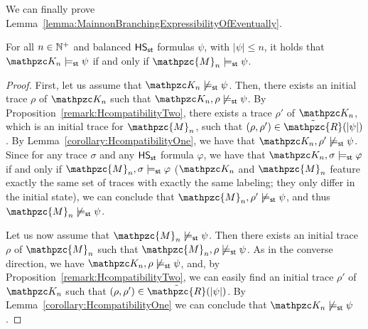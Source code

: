 We can finally prove Lemma~\ref{lemma:MainnonBranchingExpressibilityOfEventually}.
\begin{lemma*}[\ref{lemma:MainnonBranchingExpressibilityOfEventually}]
For all $n\in\mathbb{N}^+$ and balanced $\text{\sffamily HS}_{\mathsf{st}}$ formulas $\psi$, with $|\psi|\leq n$, 
it holds that $\Ku_n\models_\stat \psi$ if and only if $\mathpzc{M}_n\models_\stat \psi$.
\end{lemma*}
\begin{proof}
First, let us assume that $\Ku_n\not\models_\stat \psi$. Then, there exists an initial trace $\rho$ of $\Ku_n$ such that $\Ku_n,\rho \not \models_\stat \psi$. By Proposition~\ref{remark:HcompatibilityTwo}, there exists a trace $\rho'$ of $\Ku_n$, which is an initial trace for $\mathpzc{M}_n$, such that $(\rho,\rho') \in \tilde{\mathpzc{R}}(|\psi|)$. By Lemma~\ref{corollary:HcompatibilityOne}, we have 
that $\Ku_n,\rho ' \not \models_\stat \psi$. Since for any trace $\sigma$ and any $\text{\sffamily HS}_{\mathsf{st}}$ formula $\varphi$, we have that $\Ku_n,\sigma \models_\stat \varphi$ if and only if $\mathpzc{M}_n,\sigma \models_\stat \varphi$ ($\Ku_n$ and $\mathpzc{M}_n$ feature exactly the same set of traces with exactly the same labeling; they only differ in the initial state), we can conclude that $\mathpzc{M}_n,\rho ' \not \models_\stat \psi$, and thus $\mathpzc{M}_n\not \models_\stat \psi$.

Let us now assume that $\mathpzc{M}_n\not \models_\stat \psi$. Then there exists an initial trace $\rho$ of $\mathpzc{M}_n$ such that $\mathpzc{M}_n,\rho \not \models_\stat \psi$. As in the converse direction, we have $\Ku_n,\rho \not \models_\stat \psi$, and, by Proposition~\ref{remark:HcompatibilityTwo}, we can easily find an initial trace $\rho'$ of $\Ku_n$ such that $(\rho,\rho') \in \tilde{\mathpzc{R}}(|\psi|)$. By Lemma~\ref{corollary:HcompatibilityOne} we can conclude that $\Ku_n\not\models_\stat \psi$.
\end{proof}
%